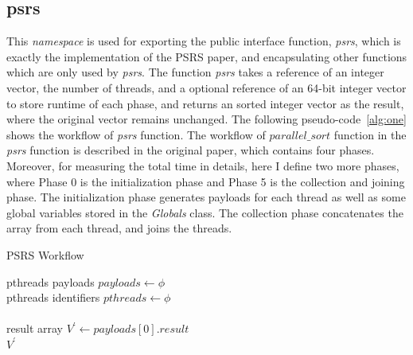 \documentclass[11pt]{article}
\begin{document}
    \subsection{psrs}
    \label{subsec:section-1-2}
    This \textit{namespace} is used for exporting the public interface function, \textit{psrs}, which is exactly the implementation of the PSRS paper, and encapsulating other functions which are only used by \textit{psrs}.
    The function \textit{psrs} takes a reference of an integer vector, the number of threads, and a optional reference of an 64-bit integer vector to store runtime of each phase, and returns an sorted integer vector as the result, where the original vector remains unchanged.
    The following pseudo-code~\ref{alg:one} shows the workflow of \textit{psrs} function.
    The workflow of $parallel\_sort$ function in the \textit{psrs} function is described in the original paper, which contains four phases.
    Moreover, for measuring the total time in details, here I define two more phases, where Phase 0 is the initialization phase and Phase 5 is the collection and joining phase.
    The initialization phase generates payloads for each thread as well as some global variables stored in the \textit{Globals} class.
    The collection phase concatenates the array from each thread, and joins the threads.

    \begin{algorithm}
        \caption{PSRS Workflow}
        \label{alg:one}
        \BlankLine
        pthreads payloads $payloads \longleftarrow \phi$\\
        pthreads identifiers $pthreads \longleftarrow \phi$\\
        \\
        result array $V^{'} \longleftarrow payloads[0].result$\\
        \Return $V^{'}$
    \end{algorithm}
\end{document}
